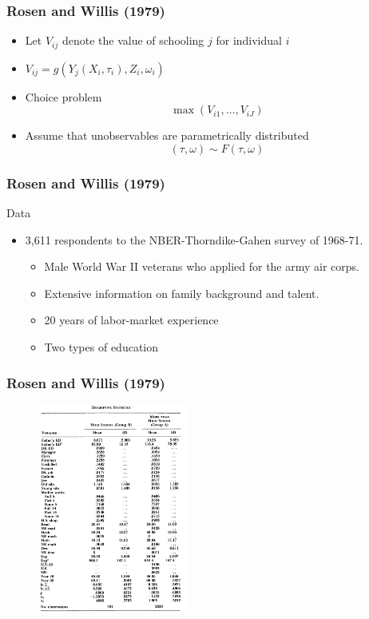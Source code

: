 \documentclass{beamer}
\newcommand{\1}{\mathbb{1}}
\begin{document}
\begin{frame}\frametitle{Rosen and Willis (1979)}
\begin{itemize}
\item Let $V_{ij}$ denote the value of schooling $j$ for individual $i$ 
\item $V_{ij} = g(Y_j(X_i,\tau_i),Z_i,\omega_i)$
\item Choice problem 
\begin{equation}
\max (V_{i1}, \ldots, V_{iJ})
\end{equation}
\item Assume that unobservables are parametrically distributed 
\begin{equation*}
(\tau, \omega) \sim F(\tau,\omega)
\end{equation*}
\end{itemize}

\end{frame}

\begin{frame}\frametitle{Rosen and Willis (1979)}
Data
\begin{itemize}
\item 3,611 respondents to the NBER-Thorndike-Gahen survey of 1968-71.
\begin{itemize}
\item Male World War II veterans who applied for the army air corps. 
\item Extensive information on family background and talent.
\item 20 years of labor-market experience
\item Two types of education
\end{itemize}
\end{itemize}
\end{frame}


\begin{frame}\frametitle{Rosen and Willis (1979)}
\begin{figure}[here]
\includegraphics[width=5cm]{plot/descRW}
\end{figure}
\end{frame}
\end{document}
